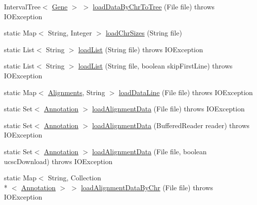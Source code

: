 \begin{DoxyCompactItemize}
Interval\+Tree$<$ \hyperlink{classumms_1_1core_1_1annotation_1_1_gene}{Gene} $>$ $>$ \hyperlink{classbroad_1_1pda_1_1annotation_1_1_b_e_d_file_parser_ae27912e09eef7a2d3988438d9e7075ae}{load\+Data\+By\+Chr\+To\+Tree} (File file)  throws I\+O\+Exception
\item 
static Map$<$ String, Integer $>$ \hyperlink{classbroad_1_1pda_1_1annotation_1_1_b_e_d_file_parser_af10836c823e704c497928ab17a821cd7}{load\+Chr\+Sizes} (String file)
\item 
static List$<$ String $>$ \hyperlink{classbroad_1_1pda_1_1annotation_1_1_b_e_d_file_parser_a4d2c217089e510f4ef1e1e6c7e62cffd}{load\+List} (String file)  throws I\+O\+Exception 
\item 
static List$<$ String $>$ \hyperlink{classbroad_1_1pda_1_1annotation_1_1_b_e_d_file_parser_acb554507b03d62c0ff496c8c7c70f5da}{load\+List} (String file, boolean skip\+First\+Line)  throws I\+O\+Exception 
\item 
static Map$<$ \hyperlink{classbroad_1_1pda_1_1datastructures_1_1_alignments}{Alignments}, String $>$ \hyperlink{classbroad_1_1pda_1_1annotation_1_1_b_e_d_file_parser_a2e3c32b1c47fd04e187ea6404b3da572}{load\+Data\+Line} (File file)  throws I\+O\+Exception
\item 
static Set$<$ \hyperlink{interfaceumms_1_1core_1_1annotation_1_1_annotation}{Annotation} $>$ \hyperlink{classbroad_1_1pda_1_1annotation_1_1_b_e_d_file_parser_a193f67998c823b9ff7349f770a1d3039}{load\+Alignment\+Data} (File file)  throws I\+O\+Exception
\item 
static Set$<$ \hyperlink{interfaceumms_1_1core_1_1annotation_1_1_annotation}{Annotation} $>$ \hyperlink{classbroad_1_1pda_1_1annotation_1_1_b_e_d_file_parser_ab74c197238ed0593faa218f4b8e2f232}{load\+Alignment\+Data} (Buffered\+Reader reader)  throws I\+O\+Exception
\item 
static Set$<$ \hyperlink{interfaceumms_1_1core_1_1annotation_1_1_annotation}{Annotation} $>$ \hyperlink{classbroad_1_1pda_1_1annotation_1_1_b_e_d_file_parser_a11d0ce525a888526bb52dc0e2a62417d}{load\+Alignment\+Data} (File file, boolean ucsc\+Download)  throws I\+O\+Exception
\item 
static Map$<$ String, Collection\\*
$<$ \hyperlink{interfaceumms_1_1core_1_1annotation_1_1_annotation}{Annotation} $>$ $>$ \hyperlink{classbroad_1_1pda_1_1annotation_1_1_b_e_d_file_parser_a9ddcdf075a82ab131dd332a0888b9057}{load\+Alignment\+Data\+By\+Chr} (File file)  throws I\+O\+Exception
\item 

\end{DoxyCompactItemize}
